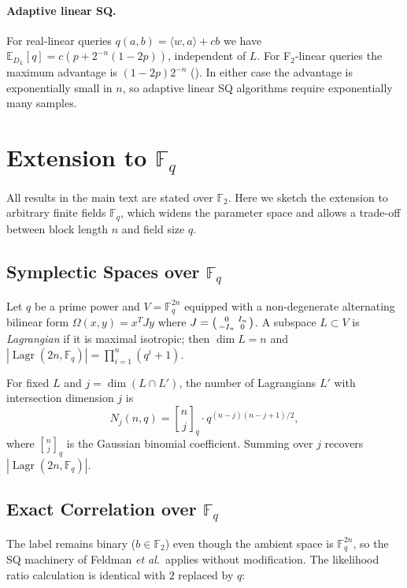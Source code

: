 \documentclass[11pt,a4paper]{article}
\theoremstyle{plain}
\theoremstyle{definition}
\newcommand{\F}{\mathbb{F}}
\newcommand{\E}{\mathbb{E}}
\DeclareMathOperator{\Lagr}{Lagr}
\newcommand{\etal}{\textit{et al.}}
\begin{document}
\paragraph{Adaptive linear SQ.} For real-linear queries $q(a,b) = \langle w,a \rangle + cb$ we have $\E_{D_L}[q] = c(p + 2^{-n}(1-2p))$, independent of $L$. For F$_2$-linear queries the maximum advantage is $(1-2p)2^{-n}$ (). In either case the advantage is exponentially small in $n$, so adaptive linear SQ algorithms require exponentially many samples.

\section{Extension to $\F_q$}
\label{app:fq}

All results in the main text are stated over $\F_2$. Here we sketch the extension to arbitrary finite fields $\F_q$, which widens the parameter space and allows a trade-off between block length $n$ and field size $q$.

\subsection{Symplectic Spaces over $\F_q$}
\label{subsec:fq-symplectic}

Let $q$ be a prime power and $V = \F_q^{2n}$ equipped with a non-degenerate alternating bilinear form $\Omega(x,y) = x^T J y$ where $J = \begin{psmallmatrix} 0 & I_n \\ -I_n & 0 \end{psmallmatrix}$. A subspace $L \subset V$ is \emph{Lagrangian} if it is maximal isotropic; then $\dim L = n$ and $|\Lagr(2n,\F_q)| = \prod_{i=1}^n (q^i+1)$.

For fixed $L$ and $j = \dim(L \cap L')$, the number of Lagrangians $L'$ with intersection dimension $j$ is
\[
N_j(n,q) = {n \brack j}_q \cdot q^{(n-j)(n-j+1)/2},
\]
where ${n \brack j}_q$ is the Gaussian binomial coefficient. Summing over $j$ recovers $|\Lagr(2n,\F_q)|$.

\subsection{Exact Correlation over $\F_q$}
\label{subsec:fq-corr}

The label remains binary ($b \in \F_2$) even though the ambient space is $\F_q^{2n}$, so the SQ machinery of Feldman \etal\ applies without modification. The likelihood ratio calculation is identical with $2$ replaced by $q$:
\end{document}
